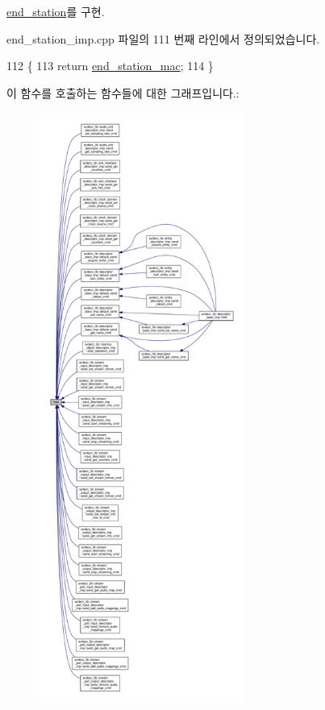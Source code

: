 \hyperlink{classavdecc__lib_1_1end__station_a74d2328723e6f5ab7a275e3b0d4cf2a0}{end\+\_\+station}를 구현.



end\+\_\+station\+\_\+imp.\+cpp 파일의 111 번째 라인에서 정의되었습니다.


\begin{DoxyCode}
112 \{
113     \textcolor{keywordflow}{return} \hyperlink{classavdecc__lib_1_1end__station__imp_a0e9fa7b31d903107ff9e7aac9dac172d}{end\_station\_mac};
114 \}
\end{DoxyCode}


이 함수를 호출하는 함수들에 대한 그래프입니다.\+:
\nopagebreak
\begin{figure}[H]
\begin{center}
\leavevmode
\includegraphics[height=550pt]{classavdecc__lib_1_1end__station__imp_a08e1bd1861b3b8f447ea374a65ac11f9_icgraph}
\end{center}
\end{figure}


